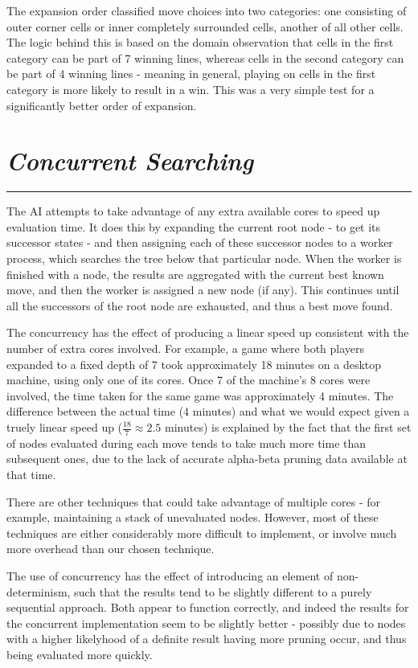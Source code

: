 \documentclass[10pt]{report}
\begin{document}
\begin{multicols}{2}
The expansion order classified move choices into two categories: one consisting of outer corner cells or inner completely surrounded cells, another of all other cells. The logic behind this is based on the domain observation that cells in the first category can be part of 7 winning lines, whereas cells in the second category can be part of 4 winning lines - meaning in general, playing on cells in the first category is more likely to result in a win. This was a very simple test for a significantly better order of expansion.

\section*{\emph{\textmd{Concurrent Searching}}}
\hrule
\vspace{0.4cm}

The AI attempts to take advantage of any extra available cores to speed up evaluation time. It does this by expanding the current root node - to get its successor states - and then assigning each of these successor nodes to a worker process, which searches the tree below that particular node. When the worker is finished with a node, the results are aggregated with the current best known move, and then the worker is assigned a new node (if any). This continues until all the successors of the root node are exhausted, and thus a best move found.

The concurrency has the effect of producing a linear speed up consistent with the number of extra cores involved. For example, a game where both players expanded to a fixed depth of 7 took approximately 18 minutes on a desktop machine, using only one of its cores. Once 7 of the machine's 8 cores were involved, the time taken for the same game was approximately 4 minutes. The difference between the actual time (4 minutes) and what we would expect given a truely linear speed up ($\frac{18}{7} \approx 2.5$ minutes) is explained by the fact that the first set of nodes evaluated during each move tends to take much more time than subsequent ones, due to the lack of accurate alpha-beta pruning data available at that time.

There are other techniques that could take advantage of multiple cores - for example, maintaining a stack of unevaluated nodes. However, most of these techniques are either considerably more difficult to implement, or involve much more overhead than our chosen technique.

The use of concurrency has the effect of introducing an element of non-determinism, such that the results tend to be slightly different to a purely sequential approach. Both appear to function correctly, and indeed the results for the concurrent implementation seem to be slightly better - possibly due to nodes with a higher likelyhood of a definite result having more pruning occur, and thus being evaluated more quickly.


\end{multicols}
\end{document}
